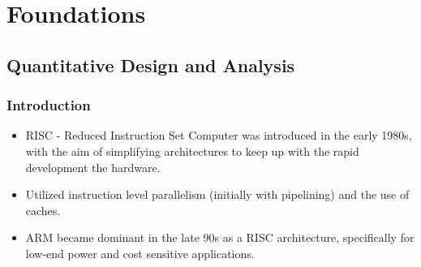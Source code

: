 \section{Foundations}\label{sec:foundations}

\subsection{Quantitative Design and Analysis}\label{sec:quant}

\subsubsection{Introduction}
\begin{itemize}
    \item RISC - Reduced Instruction Set Computer was introduced in the early 1980s, with the aim of simplifying architectures to keep up with the rapid development the hardware.
    \item Utilized instruction level parallelism (initially with pipelining) and the use of caches.
    \item ARM became dominant in the late 90s as a RISC architecture, specifically for low-end power and cost sensitive applications.
\end{itemize}
